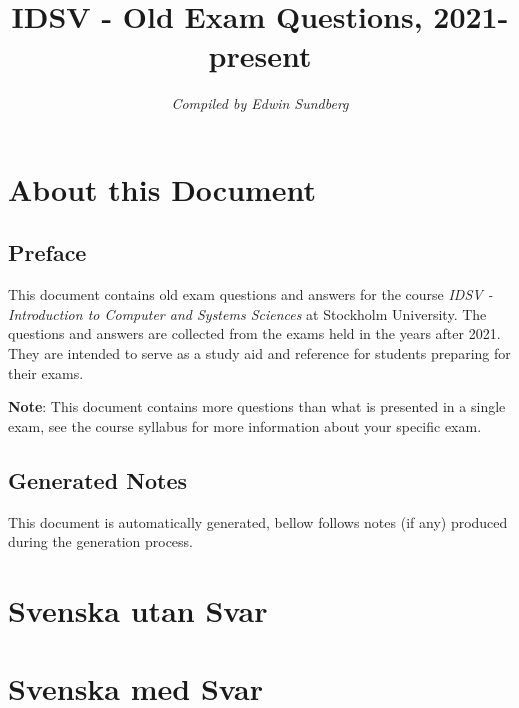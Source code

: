\documentclass[a4paper,11pt,oneside]{book}
\title{IDSV - Old Exam Questions, 2021-present}
\author{\textit{Compiled by Edwin Sundberg}}
\begin{document}
\maketitle \pagebreak

\begin{sloppypar}  

\tableofcontents \pagebreak

\chapter{About this Document}

\section{Preface}
\label{preface}
This document contains old exam questions and answers for the course \textit{IDSV - Introduction to Computer and Systems Sciences} at Stockholm University. The questions and answers are collected from the exams held in the years after 2021. They are intended to serve as a study aid and reference for students preparing for their exams.


\textbf{Note}: This document contains more questions than what is presented in a single exam, see the course syllabus for more information about your specific exam.

\section{Generated Notes}
\label{generatedNotes}

This document is automatically generated, bellow follows notes (if any) produced during the generation process.



\chapter{Svenska utan Svar}
\label{svenskaUtanSvar}


\chapter{Svenska med Svar}
\label{svenska}



\end{sloppypar}
\end{document}
